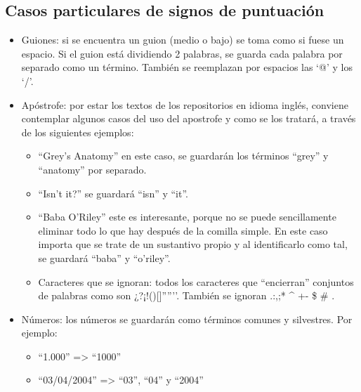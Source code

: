  
\subsection{Casos particulares de signos de puntuación}
 
\begin{itemize}

\item Guiones: si se encuentra un guion (medio o bajo) se toma como si fuese un espacio. Si el guion está dividiendo 2 palabras, se guarda cada palabra por separado como un término. También se reemplazan por espacios las ‘@’ y los ‘/’.

\item Apóstrofe: por estar los textos de los repositorios en idioma inglés, conviene contemplar algunos casos del uso del apostrofe y como se los tratará, a través de los siguientes ejemplos:
\begin{itemize}

\item   “Grey’s Anatomy” en este caso, se guardarán los términos “grey” y “anatomy” por separado.
\item   “Isn’t it?” se guardará “isn” y “it”.
\item   “Baba O’Riley” este es interesante, porque no se puede sencillamente eliminar todo lo que hay después de la comilla simple. En este caso importa que se trate de un sustantivo propio y al identificarlo como tal, se guardará “baba” y “o’riley”.
 \item  Caracteres que se ignoran: todos los caracteres que “encierran” conjuntos de palabras como son ¿?¡!()[]{}””’’. También se ignoran .:,;* \^{} +- \$ \# .

\end{itemize}

\item Números: los números se guardarán como términos comunes y silvestres. Por ejemplo:
\begin{itemize}
\item  “1.000” => “1000”
\item “03/04/2004” => “03”, “04” y “2004”
\end{itemize}

\end{itemize}